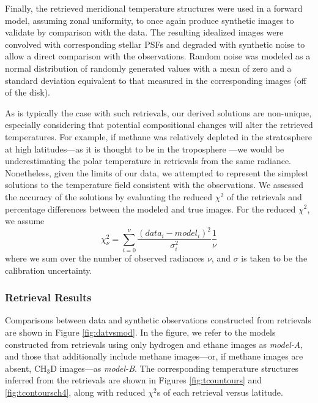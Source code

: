 \documentclass[twocolumn,10pt]{aastex631}
\begin{document}
Finally, the retrieved meridional temperature structures were used in a forward model, assuming zonal uniformity, to once again produce synthetic images to validate by comparison with the data. The resulting idealized images were convolved with corresponding stellar PSFs and degraded with synthetic noise to allow a direct comparison with the observations. Random noise was modeled as a normal distribution of randomly generated values with a mean of zero and a standard deviation equivalent to that measured in the corresponding images (off of the disk). 

As is typically the case with such retrievals, our derived solutions are non-unique, especially considering that potential compositional changes will alter the retrieved temperatures. For example, if methane was relatively depleted in the stratosphere at high latitudes---as it is thought to be in the troposphere \citep{karkoschka2011haze,irwin2019latitudinal}---we would be underestimating the polar temperature in retrievals from the same radiance. Nonetheless, given the limits of our data, we attempted to represent the simplest solutions to the temperature field consistent with the observations. We assessed the accuracy of the solutions by evaluating the reduced $\chi^2$ of the retrievals and percentage differences between the modeled and true images. For the reduced $\chi^2$, we assume \begin{equation}
    \chi^2_\nu=\sum_{i=0}^{\nu}\frac{(data_i-model_i)^2}{\sigma_i^2}\frac{1}{\nu}
\end{equation}where we sum over the number of observed radiances $\nu$, and $\sigma$ is taken to be the calibration uncertainty. 

\subsubsection{Retrieval Results}

Comparisons between data and synthetic observations constructed from retrievals are shown in Figure \ref{fig:datvsmod}. In the figure, we refer to the models constructed from retrievals using only hydrogen and ethane images as \textit{model-A}, and those that additionally include methane images---or, if methane images are absent, CH$_3$D images---as \textit{model-B}. The corresponding temperature structures inferred from the retrievals are shown in Figures \ref{fig:tcountours} and \ref{fig:tcontoursch4}, along with reduced $\chi^2$s of each retrieval versus latitude.
\end{document}
